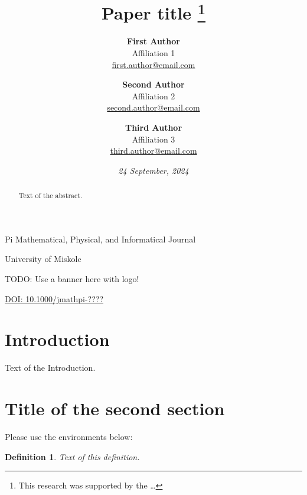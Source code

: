 \documentclass[a4paper,12pt]{article}
\newtheorem{definition}[theorem]{Definition}
\begin{document}
\pagestyle{fancy}

\title{\sc Paper title \thanks{This research was supported by the \dots}}

\author{
	\textbf{First Author} \\
	Affiliation 1 \\
	\href{mailto:first.author@email.com}{first.author@email.com}
\and
	\textbf{Second Author} \\
	Affiliation 2 \\
	\href{mailto:second.author@email.com}{second.author@email.com}
\and
	\textbf{Third Author} \\
	Affiliation 3 \\
	\href{mailto:third.author@email.com}{third.author@email.com}
}

\date{\textit{24 September, 2024}}

Pi Mathematical, Physical, and Informatical Journal

University of Miskolc

TODO: Use a banner here with logo!

\href{https://doi.org/10.1000/jmathpi-1}{DOI: 10.1000/jmathpi-????}

{\let\newpage\relax\maketitle}

\begin{abstract}
Text of the abstract.
\end{abstract}

{\def\thefootnote{}}

\section{Introduction}

Text of the Introduction.

\section{Title of the second section}

Please use the environments below:

\begin{definition}
Text of this definition.
\end{definition}
\end{document}
